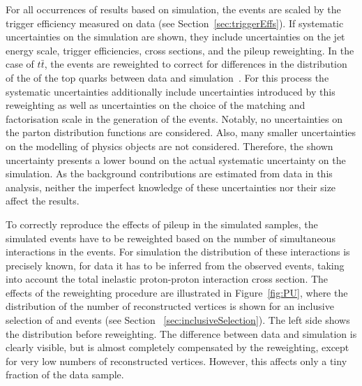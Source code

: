 For all occurrences of results based on simulation, the events are scaled by the trigger efficiency measured on data (see Section~\ref{sec:triggerEffs}). If systematic uncertainties on the simulation are shown, they include uncertainties on the jet energy scale, trigger efficiencies, cross sections, and the pileup reweighting. In the case of $t\bar{t}$, the events are reweighted to correct for differences in the distribution of the \pt of the top quarks between data and simulation~\cite{TopReweighting}. For this process the systematic uncertainties additionally include uncertainties introduced by this reweighting as well as uncertainties on the choice of the matching and factorisation scale in the generation of the events. Notably, no uncertainties on the parton distribution functions are considered. Also, many smaller uncertainties on the modelling of physics objects are not considered. Therefore, the shown uncertainty presents a lower bound on the actual systematic uncertainty on the simulation. As the background contributions are estimated from data in this analysis, neither the imperfect knowledge of these uncertainties nor their size affect the results.

To correctly reproduce the effects of pileup in the simulated samples, the simulated events have to be reweighted based on the number of simultaneous interactions in the events. For simulation the distribution of these interactions is precisely known, for data it has to be inferred from the observed events, taking into account the total inelastic proton-proton interaction cross section. The effects of the reweighting procedure are illustrated in Figure~\ref{fig:PU}, where the distribution of the number of reconstructed vertices is shown for an inclusive selection of \EE and \MM events (see Section ~\ref{sec:inclusiveSelection}). The left side shows the distribution before reweighting. The difference between data and simulation is clearly visible, but is almost completely compensated by the reweighting, except for very low numbers of reconstructed vertices. However, this affects only a tiny fraction of the data sample.

